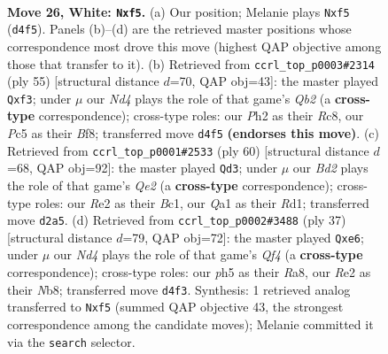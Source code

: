 \documentclass[11pt]{article}
\begin{document}
\clearpage

\begin{figure}[p]\centering
\begin{subfigure}{0.46\textwidth}\centering
\resizebox{\linewidth}{!}{%
\newchessgame
\chessboard[
  setfen={r2rn1k1/p1p2p2/6p1/2Pp1b1p/3NqP2/1P2P1P1/3BR2P/Q2K1BR1 w - - 1 26},
  showmover=false,
  pgfstyle=straightmove, color=movearrow, markmove={d4-f5}
]}
\caption{}
\end{subfigure}\hfill
\begin{subfigure}{0.46\textwidth}\centering
\resizebox{\linewidth}{!}{%
\newchessgame
\chessboard[
  setfen={2rr1bk1/pq3p2/3p2p1/2n1p2p/7P/1P3QP1/PBN1PP2/2RR2K1 b - - 3 28},
  showmover=false,
  pgfstyle=straightmove, color=movearrow, markmove={b7-f3}
]}
\caption{}
\end{subfigure}
\\[4pt]
\begin{subfigure}{0.46\textwidth}\centering
\resizebox{\linewidth}{!}{%
\newchessgame
\chessboard[
  setfen={4r1k1/2br1pp1/1p1n3p/p2p4/P2Nq3/1RP1P1P1/4QP1P/2BR2K1 w - - 6 31},
  showmover=false,
  pgfstyle=straightmove, color=movearrow, markmove={e2-d3}
]}
\caption{}
\end{subfigure}\hfill
\begin{subfigure}{0.46\textwidth}\centering
\resizebox{\linewidth}{!}{%
\newchessgame
\chessboard[
  setfen={rn2k2r/4p2p/p1p1Qbp1/5q2/NpP5/6P1/PP3P1P/R1B1R1K1 b kq - 4 19},
  showmover=false,
  pgfstyle=straightmove, color=movearrow, markmove={f5-e6}
]}
\caption{}
\end{subfigure}
\caption{\textbf{Move 26, White: \texttt{Nxf5}.} (a) Our position; Melanie plays \texttt{Nxf5} (\texttt{d4f5}). Panels (b)--(d) are the retrieved master positions whose correspondence most drove this move (highest QAP objective among those that transfer to it). (b) Retrieved from \texttt{ccrl\_top\_p0003\#2314} (ply 55) [structural distance $d$=70, QAP obj=43]: the master played \texttt{Qxf3}; under $\mu$ our \emph{Nd4} plays the role of that game's \emph{Qb2} (a \textbf{cross-type} correspondence); cross-type roles: our \emph{P}h2 as their \emph{R}c8, our \emph{P}c5 as their \emph{B}f8; transferred move \texttt{d4f5} \textbf{(endorses this move)}. (c) Retrieved from \texttt{ccrl\_top\_p0001\#2533} (ply 60) [structural distance $d$=68, QAP obj=92]: the master played \texttt{Qd3}; under $\mu$ our \emph{Bd2} plays the role of that game's \emph{Qe2} (a \textbf{cross-type} correspondence); cross-type roles: our \emph{R}e2 as their \emph{B}c1, our \emph{Q}a1 as their \emph{R}d1; transferred move \texttt{d2a5}. (d) Retrieved from \texttt{ccrl\_top\_p0002\#3488} (ply 37) [structural distance $d$=79, QAP obj=72]: the master played \texttt{Qxe6}; under $\mu$ our \emph{Nd4} plays the role of that game's \emph{Qf4} (a \textbf{cross-type} correspondence); cross-type roles: our \emph{p}h5 as their \emph{R}a8, our \emph{R}e2 as their \emph{N}b8; transferred move \texttt{d4f3}. Synthesis: 1 retrieved analog transferred to \texttt{Nxf5} (summed QAP objective 43, the strongest correspondence among the candidate moves); Melanie committed it via the \texttt{search} selector.}
\label{fig:thought-m50}
\end{figure}
\end{document}
